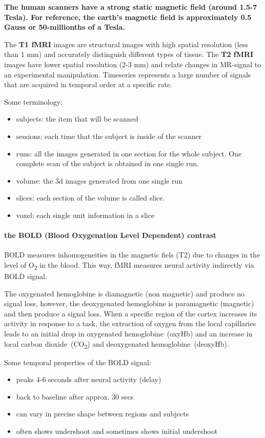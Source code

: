 \documentclass[12pt,article,oneside,a4paper]{memoir}
\begin{document}
\textbf{The human scanners have a strong static magnetic field (around 1.5-7
Tesla). For reference, the earth's magnetic field is approximately 0.5 Gauss or
50-millionths of a Tesla.}

The \textbf{T1 fMRI} images are structural images with high spatial resolution
(less than 1 mm) and accurately distinguish different types of tissue. The
\textbf{T2 fMRI} images have lower spatial resolution (2-3 mm) and relate
changes in MR-signal  to an experimental manipulation.
Timeseries represents a large number of signals that are acquired in temporal
order at a specific rate.

Some terminology:
\begin{itemize}
\item subjects: the item that will be scanned
\item sessions: each time that the subject is inside of the scanner
\item runs: all the images generated in one section for the whole subject. One
complete scan of the subject is obtained in one single run.
\item volume: the 3d images generated from one single run
\item slices: each section of the volume is called slice.
\item voxel: each single unit information in a slice
\end{itemize}

\paragraph{the BOLD (Blood Oxygenation Level Dependent) contrast}
\label{bold-fmri}

BOLD measures inhomogeneities in the magnetic fiels (T2) due to changes in the
level of O\textsubscript{2} in the blood. This way, fMRI measures neural
activity indirectly via BOLD signal.

The oxygenated hemoglobine is diamagnetic (non magnetic) and produce no signal
loss, however, the deoxygenated hemoglobine is paramagnetic (magnetic) and then
produce a signal loss. When a specific region of the cortex increases its
activity in response to a task, the extraction of oxygen from the local
capillaries leads to an initial drop in oxygenated hemoglobine~(oxyHb) and an
increase in local carbon dioxide~(CO\textsubscript{2}) and deoxygenated
hemoglobine~(deoxyHb).

Some temporal properties of the BOLD signal:
\begin{itemize}
\item peaks 4-6 seconds after neural activity (delay)
\item back to baseline after approx. 30 secs
\item can vary in precise shape between regions and subjects
\item often shows undershoot and sometimes shows initial undershoot
\end{itemize}
\end{document}
